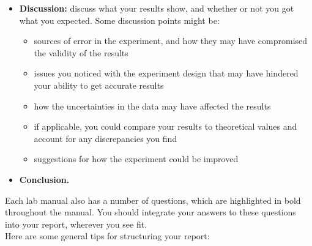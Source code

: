 \documentclass[11pt]{extarticle}
\begin{document}
\begin{itemize}
	\item {\bf Discussion:} discuss what your results show, and whether or not you got what you expected. Some discussion points might be:
		\begin{itemize}
			\item sources of error in the experiment, and how they may have compromised the validity of the results 
			\item issues you noticed with the experiment design that may have hindered your ability to get accurate results 
			\item how the uncertainties in the data may have affected the results 
			\item if applicable, you could compare your results to theoretical values and account for any discrepancies you find 
			\item suggestions for how the experiment could be improved 
		\end{itemize}

	\item {\bf Conclusion.} 
\end{itemize}

\hfill 

Each lab manual also has a number of questions, which are highlighted in bold throughout the manual. You should integrate your answers to these questions into your report, wherever you see fit. \\ 

Here are some general tips for structuring your report:

\hfill 
\end{document}
